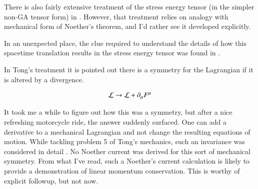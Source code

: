 \documentclass{article}
\begin{document}
There is also fairly extensive treatment
of the stress energy tensor (in the simpler non-GA tensor form) in
\cite{jackson1975cew}.  However, that treatment relies on analogy with
mechanical form of Noether's theorem, and I'd rather see it developed
explicitly.

In an unexpected place, the 
clue required to understand the details of 
how this spacetime translation results in the stress energy tensor
was found in
\cite{TongQFT}.

In Tong's treatment it is pointed out there is a symmetry for the Lagrangian
if it is altered by a divergence.

\begin{align*}
\mathcal{L} \rightarrow \mathcal{L} + \partial_\mu F^\mu
\end{align*}

It took me a while to figure out how this was a symmetry, but after a
nice refreshing motorcycle ride, the answer suddenly surfaced.  One
can add a derivative to a mechanical Lagrangian and not change
the resulting equations of motion.  While tackling problem 5 of 
Tong's mechanics, such an invariance was considered in
detail
.  No Noether current was 
derived for this sort of mechanical symmetry.  From
what I've read, such a Noether's current calculation is 
likely to provide a demonstration of linear momentum conservation.  This
is worthy of explicit followup, but not now.





\end{document}
